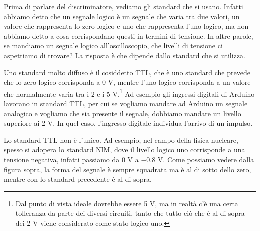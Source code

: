 Prima di parlare del discriminatore, vediamo gli standard che si usano. Infatti abbiamo detto che un segnale logico è un segnale che varia tra due valori, un valore che rappresenta lo zero logico e uno che rappresenta l'uno logico, ma non abbiamo detto a cosa corrispondano questi in termini di tensione. In altre parole, se mandiamo un segnale logico all'oscilloscopio, che livelli di tensione ci aspettiamo di trovare? La risposta è che dipende dallo standard che si utilizza.
\begin{figure}[H]
   \centering
\end{figure}

Uno standard molto diffuso è il cosiddetto TTL, che è uno standard che prevede che lo zero logico corrisponda a 0 V, mentre l'uno logico corrisponda a un valore che normalmente varia tra i 2 e i 5 V.\footnote{Dal punto di vista ideale dovrebbe essere 5 V, ma in realtà c'è una certa tolleranza da parte dei diversi circuiti, tanto che tutto ciò che è al di sopra dei 2 V viene considerato come stato logico uno.} Ad esempio gli ingressi digitali di Arduino lavorano in standard TTL, per cui se vogliamo mandare ad Arduino un segnale analogico e vogliamo che sia presente il segnale, dobbiamo mandare un livello superiore ai 2 V. In quel caso, l'ingresso digitale individua l'arrivo di un impulso.

Lo standard TTL non è l'unico. Ad esempio, nel campo della fisica nucleare, spesso si adopera lo standard NIM, dove il livello logico uno corrisponde a una tensione negativa, infatti passiamo da 0 V a $-0.8$ V. Come possiamo vedere dalla figura sopra, la forma del segnale è sempre squadrata ma è al di sotto dello zero, mentre con lo standard precedente è al di sopra.


